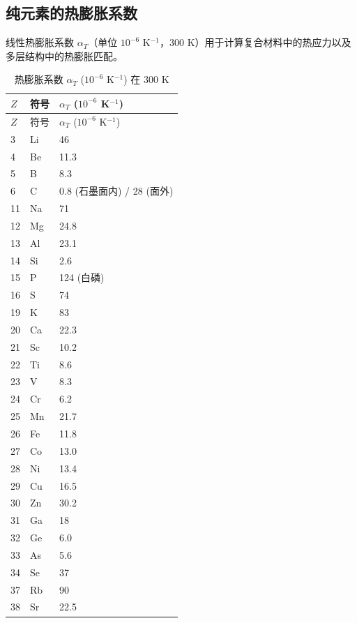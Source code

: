 \documentclass[12pt,a4paper]{article}
\begin{document}
	\subsection{纯元素的热膨胀系数}
	\label{subsec:thermal-expansion}
	
	线性热膨胀系数 \(\alpha_T\)（单位 \(10^{-6}\) K\(^{-1}\)，300 K）用于计算复合材料中的热应力以及多层结构中的热膨胀匹配。
	
	\begin{longtable}{p{0.6cm}p{1.2cm}p{1.5cm}}
		\caption{热膨胀系数 \(\alpha_T\) (\(10^{-6}\) K\(^{-1}\)) 在 300 K} \label{tab:thermal-expansion-all} \\
		\toprule
		\(Z\) & 符号 & \(\alpha_T\) (\(10^{-6}\) K\(^{-1}\)) \\
		\midrule
		\endfirsthead
		\toprule
		\(Z\) & 符号 & \(\alpha_T\) (\(10^{-6}\) K\(^{-1}\)) \\
		\midrule
		\endhead
		3  & Li & 46 \\
		4  & Be & 11.3 \\
		5  & B  & 8.3 \\
		6  & C  & 0.8 (石墨面内) / 28 (面外) \\
		11 & Na & 71 \\
		12 & Mg & 24.8 \\
		13 & Al & 23.1 \\
		14 & Si & 2.6 \\
		15 & P  & 124 (白磷) \\
		16 & S  & 74 \\
		19 & K  & 83 \\
		20 & Ca & 22.3 \\
		21 & Sc & 10.2 \\
		22 & Ti & 8.6 \\
		23 & V  & 8.3 \\
		24 & Cr & 6.2 \\
		25 & Mn & 21.7 \\
		26 & Fe & 11.8 \\
		27 & Co & 13.0 \\
		28 & Ni & 13.4 \\
		29 & Cu & 16.5 \\
		30 & Zn & 30.2 \\
		31 & Ga & 18 \\
		32 & Ge & 6.0 \\
		33 & As & 5.6 \\
		34 & Se & 37 \\
		37 & Rb & 90 \\
		38 & Sr & 22.5 \\

\end{longtable}
\end{document}
